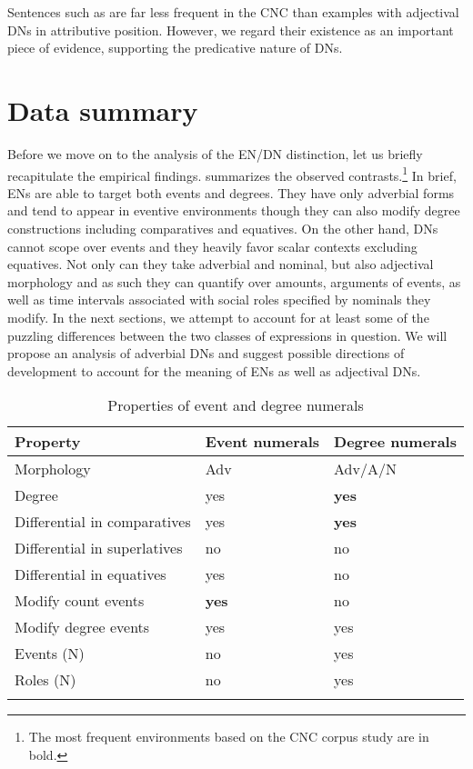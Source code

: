 \documentclass[output=paper,
modfonts,
hidelinks,
newtxmath
]{langscibook}
\begin{document}
\noindent Sentences such as  are far less frequent in the CNC than examples with adjectival DNs in attributive position. However, we regard their existence as an important piece of evidence, supporting the predicative nature of DNs.

\section{Data summary}\label{data-summary}

Before we move on to the analysis of the EN/DN distinction, let us briefly recapitulate the empirical findings.  summarizes the observed contrasts.\footnote{The most frequent environments based on the CNC corpus study are in bold.} In brief, ENs are able to target both events and degrees. They have only adverbial forms and tend to appear in eventive environments though they can also modify degree constructions including comparatives and equatives. On the other hand, DNs cannot scope over events and they heavily favor scalar contexts excluding equatives. Not only can they take adverbial and nominal, but also adjectival morphology and as such they can quantify over amounts, arguments of events, as well as time intervals associated with social roles specified by nominals they modify. In the next sections, we attempt to account for at least some of the puzzling differences between the two classes of expressions in question. We will propose an analysis of adverbial DNs and suggest possible directions of development to account for the meaning of ENs as well as adjectival DNs.

\begin{table}[t]
\caption{Properties of event and degree numerals}\label{table:properties}
\begin{tabularx}{\textwidth}{@{}lll@{}}
\lsptoprule
Property & Event numerals & Degree numerals\tabularnewline
\midrule
Morphology & Adv & Adv/A/N\tabularnewline
Degree & yes & \textbf{yes}\tabularnewline
Differential in comparatives & yes & \textbf{yes}\tabularnewline
Differential in superlatives & no & no\tabularnewline
Differential in equatives & yes & no\tabularnewline
Modify count events & \textbf{yes} & no\tabularnewline
Modify degree events & yes & yes\tabularnewline
Events (N) & no & yes\tabularnewline
Roles (N) & no & yes\tabularnewline
\lspbottomrule
\end{tabularx}
\end{table}
\end{document}
